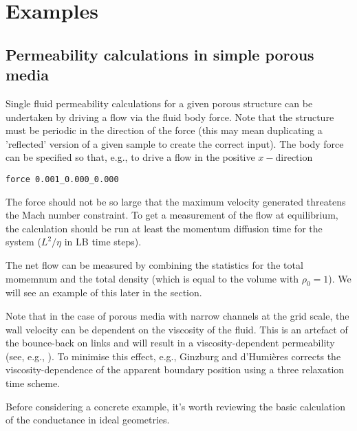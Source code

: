 %
%
%
%
%
%

\section{Examples}

\subsection{Permeability calculations in simple porous media}

Single fluid permeability calculations for a given porous structure
can be undertaken by driving a flow via the fluid body force. Note
that the structure must be periodic in the direction of the force
(this may mean duplicating a 'reflected' version of a given sample
to create the correct input). The body force can be specified so
that, e.g., to drive a flow in the positive $x-$direction
\begin{lstlisting}
force 0.001_0.000_0.000
\end{lstlisting}
The force should not be so large that the maximum velocity generated
threatens the Mach number constraint. To get a measurement of the
flow at equilibrium, the calculation should be run at least the
momentum diffusion time for the system ($L^2/\eta$ in LB time steps).

The net flow can be measured by combining the statistics for the
total momemnum and the total density (which is equal to the volume
with $\rho_0 = 1$). We will see an example of this later in the
section.

Note that in the case of porous media with narrow channels at the grid
scale, the wall velocity can be dependent on the viscosity of the fluid.
This is an artefact of the bounce-back on links and will result in a
viscosity-dependent permeability (see, e.g., \cite{lipanmiller}).
To minimise this effect, e.g.,  Ginzburg and d'Humi\`eres \cite{ginzburg}
corrects the viscosity-dependence of the apparent boundary position
using a three relaxation time scheme.

Before considering a concrete example, it's worth reviewing the basic
calculation of the conductance in ideal geometries.


